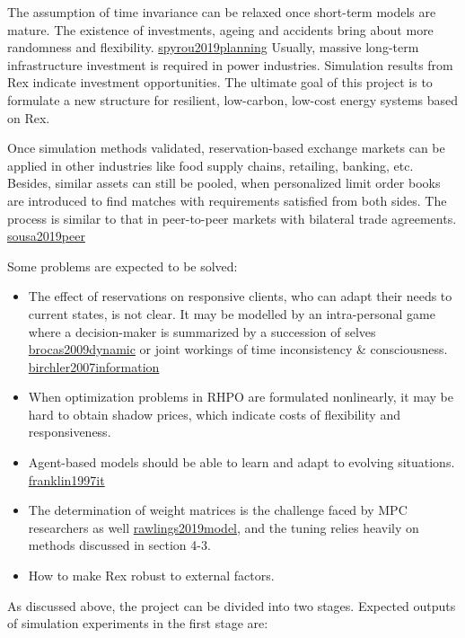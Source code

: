 \documentclass[letterpaper,8pt,twocolumn,twoside,]{pinp}
\providecommand{\tightlist}{%
  \setlength{\itemsep}{0pt}\setlength{\parskip}{0pt}}
\begin{document}
The assumption of time invariance can be relaxed once short-term models
are mature. The existence of investments, ageing and accidents bring
about more randomness and flexibility.
\protect\hyperlink{reference}{spyrou2019planning} Usually, massive
long-term infrastructure investment is required in power industries.
Simulation results from Rex indicate investment opportunities. The
ultimate goal of this project is to formulate a new structure for
resilient, low-carbon, low-cost energy systems based on Rex.

Once simulation methods validated, reservation-based exchange markets
can be applied in other industries like food supply chains, retailing,
banking, etc. Besides, similar assets can still be pooled, when
personalized limit order books are introduced to find matches with
requirements satisfied from both sides. The process is similar to that
in peer-to-peer markets with bilateral trade agreements.
\protect\hyperlink{reference}{sousa2019peer}

Some problems are expected to be solved:

\begin{itemize}
\tightlist
\item
  The effect of reservations on responsive clients, who can adapt their
  needs to current states, is not clear. It may be modelled by an
  intra-personal game where a decision-maker is summarized by a
  succession of selves \protect\hyperlink{reference}{brocas2009dynamic}
  or joint workings of time inconsistency \& consciousness.
  \protect\hyperlink{reference}{birchler2007information}
\item
  When optimization problems in RHPO are formulated nonlinearly, it may
  be hard to obtain shadow prices, which indicate costs of flexibility
  and responsiveness.
\item
  Agent-based models should be able to learn and adapt to evolving
  situations. \protect\hyperlink{reference}{franklin1997it}
\item
  The determination of weight matrices is the challenge faced by MPC
  researchers as well \protect\hyperlink{reference}{rawlings2019model},
  and the tuning relies heavily on methods discussed in section 4-3.
\item
  How to make Rex robust to external factors.
\end{itemize}

As discussed above, the project can be divided into two stages. Expected
outputs of simulation experiments in the first stage are:
\end{document}
